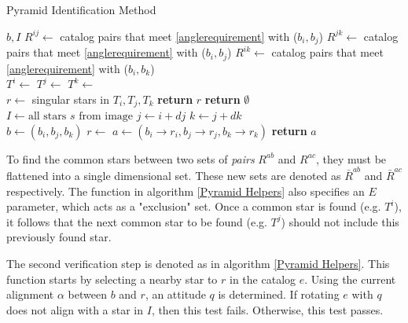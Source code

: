 \begin{algorithm}
\caption{Pyramid Identification Method}
\label{Pyramid Star Identification}
\begin{algorithmic}[1]
 {$b, I$}
\State $R^{ij} \gets$ catalog pairs that meet \eqref{anglerequirement} with ($b_i, b_j$)
\State $R^{jk} \gets$ catalog pairs that meet \eqref{anglerequirement} with ($b_i, b_j$)
\State $R^{ik} \gets$ catalog pairs that meet \eqref{anglerequirement} with ($b_i, b_k$)
\\ 
\State $T^i \gets $ 
\State $T^j \gets $ 
\State $T^k \gets $ 
\\
\State $r \gets $ singular stars in $T_i, T_j, T_k$ 
\State \textbf{return} $r$
\Else
\State \textbf{return} $\emptyset$
\EndIf
\EndIf
\EndFunction
\\
\State $I \gets \text{all stars } s \text{ from image}$
\State $j \gets i + dj$
\State $k \gets j + dk$
\\
\State $b \gets (b_i, b_j, b_k)$
\State $r \gets$ 
\State $a \gets (b_i \rightarrow r_i, b_j \rightarrow r_j, b_k \rightarrow r_k)$
\State \textbf{return} $a$
\EndIf
\EndFor
\EndFor
\EndFor
\EndProcedure
\end{algorithmic}
\end{algorithm}

To find the common stars between two sets of \textit{pairs} $R^{ab}$ and $R^{ac}$, they must be flattened into a single dimensional set. These new sets are denoted as $\bar{R}^{ab}$ and $\bar{R}^{ac}$ respectively. The function  in algorithm \eqref{Pyramid Helpers} also specifies an $E$ parameter, which acts as a "exclusion" set. Once a common star is found (e.g. $T^i$), it follows that the next common star to be found (e.g. $T^j$) should not include this previously found star. 

The second verification step is denoted as  in algorithm \eqref{Pyramid Helpers}. This function starts by selecting a nearby star to $r$ in the catalog $e$. Using the current alignment $\alpha$ between $b$ and $r$, an attitude $q$ is determined. If rotating $e$ with $q$ does not align with a star in $I$, then this test fails. Otherwise, this test passes.

